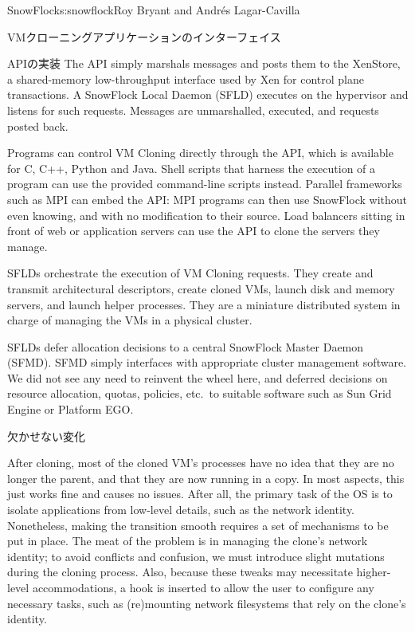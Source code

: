 \begin{aosachapter}{SnowFlock}{s:snowflock}{Roy Bryant and Andr\'e{s} Lagar-Cavilla}
\begin{aosasect1}{VMクローニングアプリケーションのインターフェイス}
\begin{aosasect2}{APIの実装}
The API simply marshals messages and posts them to the XenStore, a
shared-memory low-throughput interface used by Xen for control plane
transactions. A SnowFlock Local Daemon (SFLD) executes on the
hypervisor and listens for such requests. Messages are unmarshalled,
executed, and requests posted back.

Programs can control VM Cloning directly through the API, which is
available for C, C++, Python and Java. Shell scripts that harness the
execution of a program can use the provided command-line scripts
instead.  Parallel frameworks such as MPI can embed the API: MPI
programs can then use SnowFlock without even knowing, and with no
modification to their source.
Load balancers sitting in front of web or application
servers can use the API to clone the servers they manage.

SFLDs orchestrate the execution of VM Cloning requests. They create
and transmit architectural descriptors, create cloned VMs, launch disk
and memory servers, and launch  helper processes.  They are a
miniature distributed system in charge of managing the VMs in a
physical cluster.

SFLDs defer allocation decisions to a central SnowFlock Master Daemon
(SFMD).  SFMD simply interfaces with appropriate cluster management
software. We did not see any need to reinvent the wheel here, and
deferred decisions on resource allocation, quotas, policies, etc.\  to
suitable software such as Sun Grid Engine or Platform EGO.

\end{aosasect2}

\begin{aosasect2}{欠かせない変化}

After cloning, most of the cloned VM's processes have no idea that
they are no longer the parent, and that they are now running in a
copy. In most aspects, this just works fine and causes no
issues. After all, the primary task of the OS is to isolate
applications from low-level details, such as the network identity.
Nonetheless, making the transition smooth requires a set of mechanisms
to be put in place. The meat of the problem is in managing the clone's
network identity; to avoid conflicts and confusion, we must introduce
slight mutations during the cloning process.  Also, because these
tweaks may necessitate higher-level accommodations, a hook is inserted
to allow the user to configure any necessary tasks, such as
(re)mounting network filesystems that rely on the clone's identity.


\end{aosasect2}
\end{aosasect1}
\end{aosachapter}
